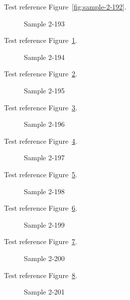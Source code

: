 Test reference Figure~\ref{fig:sample-2-192}.

\begin{figure}[tbhp]
\caption{Sample 2-193}
\label{fig:sample-2-193}
\end{figure}

Test reference Figure~\ref{fig:sample-2-193}.

\begin{figure}[tbhp]
\caption{Sample 2-194}
\label{fig:sample-2-194}
\end{figure}

Test reference Figure~\ref{fig:sample-2-194}.

\begin{figure}[tbhp]
\caption{Sample 2-195}
\label{fig:sample-2-195}
\end{figure}

Test reference Figure~\ref{fig:sample-2-195}.

\begin{figure}[tbhp]
\caption{Sample 2-196}
\label{fig:sample-2-196}
\end{figure}

Test reference Figure~\ref{fig:sample-2-196}.

\begin{figure}[tbhp]
\caption{Sample 2-197}
\label{fig:sample-2-197}
\end{figure}

Test reference Figure~\ref{fig:sample-2-197}.

\begin{figure}[tbhp]
\caption{Sample 2-198}
\label{fig:sample-2-198}
\end{figure}

Test reference Figure~\ref{fig:sample-2-198}.

\begin{figure}[tbhp]
\caption{Sample 2-199}
\label{fig:sample-2-199}
\end{figure}

Test reference Figure~\ref{fig:sample-2-199}.

\begin{figure}[tbhp]
\caption{Sample 2-200}
\label{fig:sample-2-200}
\end{figure}

Test reference Figure~\ref{fig:sample-2-200}.

\begin{figure}[tbhp]
\caption{Sample 2-201}
\label{fig:sample-2-201}
\end{figure}

